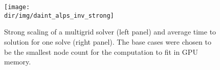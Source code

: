 \begin{figure}
\centering
\texttt{[image: \\dir/img/daint\_alps\_inv\_strong]}
\caption{
Strong scaling of a multigrid solver (left panel) and average time to solution for one solve (right panel).
The base cases were chosen to be the smallest node count for the computation to fit in GPU memory.
}
\label{fig:daint:alps:inv:strong}
\end{figure}




